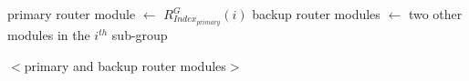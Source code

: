 \begin{algorithm}
\begin{algorithmic}[1]
\EndFor

    \State primary router module $\leftarrow$ $R^G_{Index_{primary}}(i)$
    \State backup router modules $\leftarrow$ 
     two other modules in the $i^{th}$ sub-group

    \Return $<$primary and backup router modules$>$ \\ 

\label{second:end}

\EndProcedure
\\
\end{algorithmic}
\end{algorithm}

\begin{comment}
With router placement in place, we now face the question that, how does each
client select which router to minimize communication hops as well as to avoid
congestion. This section provides an overview on route selection process and
algorithms. Routers are divided into 9 groups, with each group containing 12
router modules. We denote a router group with a superscript, and a router
module in that group with a subscript. For example, the first module in a
router group $A$ is denoted as $R^A_1$ so on and so forth. The following
algorithm describe the core idea of selection process. The input is a given
router group and client ID, the output is a triple: primary router and two back
up routers.
\end{comment}





